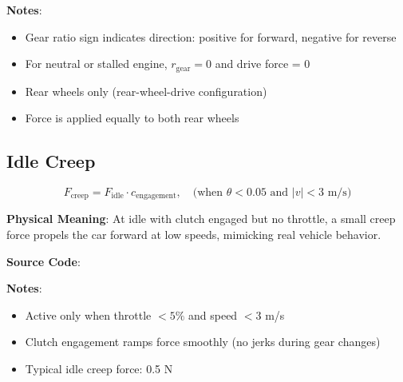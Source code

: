 \textbf{Notes}:
\begin{itemize}
  \item Gear ratio sign indicates direction: positive for forward, negative for reverse
  \item For neutral or stalled engine, $r_{\text{gear}} = 0$ and drive force = 0
  \item Rear wheels only (rear-wheel-drive configuration)
  \item Force is applied equally to both rear wheels
\end{itemize}

\subsection{Idle Creep}

\begin{equation}
  F_{\text{creep}} = F_{\text{idle}} \cdot c_{\text{engagement}}, \quad \text{(when } \theta < 0.05 \text{ and } |v| < 3 \text{ m/s)}
  \label{eq:idle-creep-engine}
\end{equation}

\textbf{Physical Meaning}: At idle with clutch engaged but no throttle, a small creep force propels the car forward at low speeds, mimicking real vehicle behavior.

\textbf{Source Code}: 

\textbf{Notes}:
\begin{itemize}
  \item Active only when throttle $< 5\%$ and speed $< 3$ m/s
  \item Clutch engagement ramps force smoothly (no jerks during gear changes)
  \item Typical idle creep force: 0.5 N
\end{itemize}

\newpage
